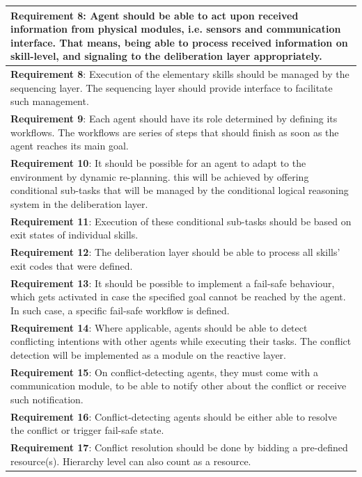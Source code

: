 \documentclass[main.tex]{subfiles}
\begin{document}
\begin{table}[htbp]
\begin{tabular}{>{\footnotesize}p{}}
\textbf{Requirement 8}: Agent should be able to act upon received information from physical
modules, i.e. sensors and communication interface. That means, being able to process received
information on skill-level, and signaling to the deliberation layer appropriately. 
\\ \midrule
\textbf{Requirement 8}: Execution of the elementary skills should be managed by the sequencing layer. 
The sequencing layer should provide interface to facilitate such management. 
\\ \midrule
\textbf{Requirement 9}: Each agent should have its role determined by defining its workflows. The workflows 
are series of steps that should finish as soon as the agent reaches its main goal. 
\\ \midrule
\textbf{Requirement 10}: It should be possible for an agent to adapt to the environment by dynamic re-planning.
this will be achieved by offering conditional sub-tasks that will be managed by the conditional logical reasoning 
system in the deliberation layer.
\\ \midrule
\textbf{Requirement 11}: Execution of these conditional sub-tasks should be based on exit states of individual skills.
\\ \midrule
\textbf{Requirement 12}: The deliberation layer should be able to process all skills' exit codes that were defined. 
\\ \midrule
\textbf{Requirement 13}: It should be possible to implement a fail-safe behaviour, which gets activated in case 
the specified goal cannot be reached by the agent. In such case, a specific fail-safe workflow is defined. 
\\ \midrule
\textbf{Requirement 14}: Where applicable, agents should be able to detect conflicting intentions with other agents
while executing their tasks. The conflict detection will be implemented as a module on the reactive layer.
\\ \midrule
\textbf{Requirement 15}: On conflict-detecting agents, they must come with a communication module, to be able to 
notify other about the conflict or receive such notification. 
\\ \midrule
\textbf{Requirement 16}: Conflict-detecting agents should be either able to resolve the conflict or trigger fail-safe 
state. 
\\ \midrule
\textbf{Requirement 17}: Conflict resolution should be done by bidding a pre-defined resource(s). Hierarchy level can 
also count as a resource.
\\ \bottomrule
    \end{tabular}
    \label{sys-requirements}
\end{table}
\end{document}
